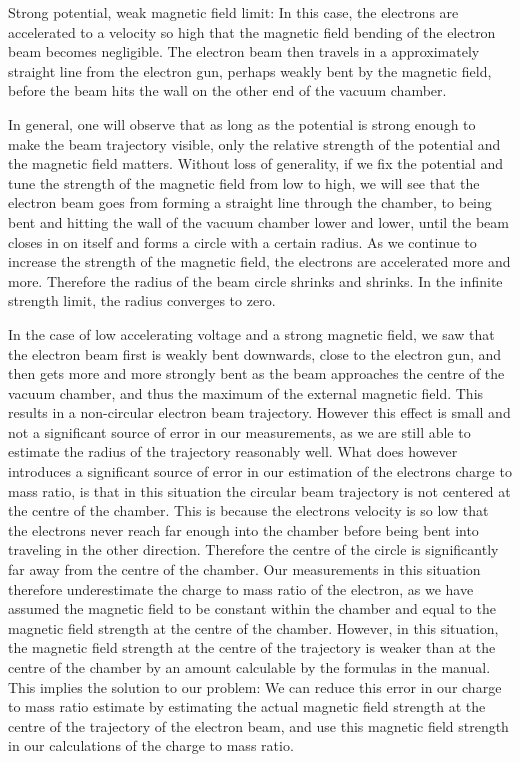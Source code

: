 \documentclass[a4paper,12pt]{article}
\begin{document}
Strong potential, weak magnetic field limit: In this case, the electrons are accelerated to a velocity so high that the magnetic field bending of the electron beam becomes negligible.
The electron beam then travels in a approximately straight line from the electron gun, perhaps weakly bent by the magnetic field, before the beam hits the wall on
the other end of the vacuum chamber.

In general, one will observe that as long as the potential is strong enough to make the beam trajectory visible, only the relative strength of the 
potential and the magnetic field matters. Without loss of generality, if we fix the potential and tune the strength of the magnetic field from low to high, 
we will see that the electron beam goes from forming a straight line through the chamber, to being bent and hitting the wall of the vacuum chamber lower 
and lower, until the beam closes in on itself and forms a circle with a certain radius. As we continue to increase the strength of the magnetic field, the 
electrons are accelerated more and more. Therefore the radius of the beam circle shrinks and shrinks. In the infinite strength limit, the radius 
converges to zero. 

In the case of low accelerating voltage and a strong magnetic field, we saw that the electron beam first is weakly bent downwards, close to the electron gun, 
and then gets more and more strongly bent as the beam approaches the centre of the vacuum chamber, and thus the maximum of the external magnetic field. This 
results in a non-circular electron beam trajectory. However this effect is small and not a significant source of error in our measurements, as we are still
able to estimate the radius of the trajectory reasonably well. What does however introduces a significant source of error in our estimation of the electrons 
charge to mass ratio, is that in this situation the circular beam trajectory is not centered at the centre of the chamber. This is because the electrons velocity 
is so low that the electrons never reach far enough into the chamber before being bent into traveling in the other direction. Therefore the centre of the 
circle is significantly far away from the centre of the chamber. Our measurements in this situation therefore underestimate the charge to mass ratio of the electron, 
as we have assumed the magnetic field to be constant within the chamber and equal to the magnetic field strength at the centre of the chamber. However, in this situation, 
the magnetic field strength at the centre of the trajectory is weaker than at the centre of the chamber by an amount calculable by the formulas in the manual. 
This implies the solution to our problem: We can reduce this error in our charge to mass ratio estimate by estimating the actual magnetic field strength at 
the centre of the trajectory of the electron beam, and use this magnetic field strength in our calculations of the charge to mass ratio.
\end{document}
